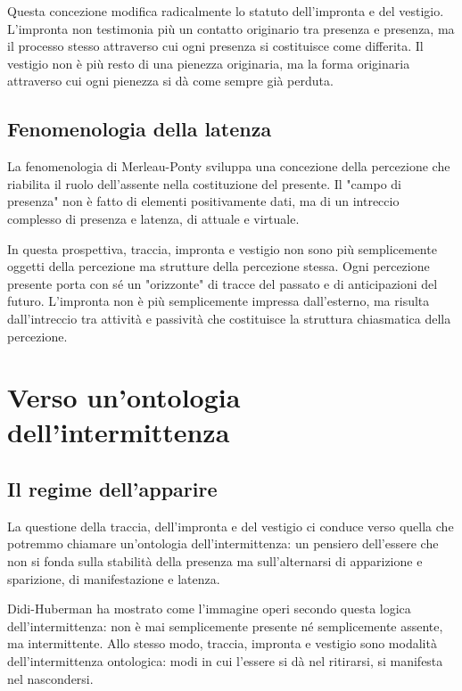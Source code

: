 \documentclass{gs}
\begin{document}
Questa concezione modifica radicalmente lo statuto dell'impronta e del vestigio. L'impronta non testimonia più un contatto originario tra presenza e presenza, ma il processo stesso attraverso cui ogni presenza si costituisce come differita. Il vestigio non è più resto di una pienezza originaria, ma la forma originaria attraverso cui ogni pienezza si dà come sempre già perduta.

\subsection{Fenomenologia della latenza}

La fenomenologia di Merleau-Ponty \cite{merleau-ponty1945} sviluppa una concezione della percezione che riabilita il ruolo dell'assente nella costituzione del presente. Il "campo di presenza" non è fatto di elementi positivamente dati, ma di un intreccio complesso di presenza e latenza, di attuale e virtuale.

In questa prospettiva, traccia, impronta e vestigio non sono più semplicemente oggetti della percezione ma strutture della percezione stessa. Ogni percezione presente porta con sé un "orizzonte" di tracce del passato e di anticipazioni del futuro. L'impronta non è più semplicemente impressa dall'esterno, ma risulta dall'intreccio tra attività e passività che costituisce la struttura chiasmatica della percezione.

\section{Verso un'ontologia dell'intermittenza}

\subsection{Il regime dell'apparire}

La questione della traccia, dell'impronta e del vestigio ci conduce verso quella che potremmo chiamare un'ontologia dell'intermittenza: un pensiero dell'essere che non si fonda sulla stabilità della presenza ma sull'alternarsi di apparizione e sparizione, di manifestazione e latenza.

Didi-Huberman \cite{didi-huberman2002} ha mostrato come l'immagine operi secondo questa logica dell'intermittenza: non è mai semplicemente presente né semplicemente assente, ma intermittente. Allo stesso modo, traccia, impronta e vestigio sono modalità dell'intermittenza ontologica: modi in cui l'essere si dà nel ritirarsi, si manifesta nel nascondersi.
\end{document}
